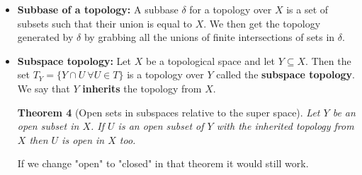 \documentclass[a4paper]{article}
\newtheorem{theorem}{Theorem}[section]
\begin{document}
\begin{itemize}
\begin{enumerate}
\item
A subset $U$ of $X$ is called open iff for every $x \in U$ there exists a $B_{0} \in B$ such that $x \in B_{0} \subset U$.
\item
The topology T is the collection of all unions of subsets in B.
\end{enumerate}
\begin{theorem}[Going from topology to base]
Let $X$ be a topological space, and $C$ a collection of open subsets from $X$. If we have that for every open subset $U$ of $X$ and $x \in U$ there exists an element $C_{0} \in C$ such that $x \in C_{0} \subset U$ then $C$ is a base for the topology $T$.
\end{theorem}

\begin{theorem}[Comparison of topologies from bases]
Let $B_{1},B_{2}$ be bases for the topologies $T_{1},T_{2}$ respectively. The following are equivalent:
\begin{enumerate}
\item
$T_{1} \subset T_{2}$
\item
For every $x$ and subsets $b_{1} \in B_{1}$ that have $x \in b_{1}$ there exists a $b_{2} \in B_{2}$ such that $x \in b_{2} \subset b_{1}$.
\end{enumerate}
\end{theorem}

\begin{theorem}[Closure and base]
Let $A\subseteq X$ and the topology on $X$ be given by a base. Then $x\in\bar{A}$ iff every basic neighborhood of $x$ intersects $A$.
\end{theorem}

\item
\textbf{Subbase of a topology: }A subbase $\delta$ for a topology over $X$ is a set of subsets such that their union is equal to $X$. We then get the topology generated by $\delta$ by grabbing all the unions of finite intersections of sets in $\delta$.

\item
\textbf{Subspace topology: }Let $X$ be a topological space and let $Y\subseteq X$. Then the set $T_{Y}=\{Y\cap U\ \forall U\in T \}$ is a topology over $Y$ called the \textbf{subspace topology}. We say that $Y$ \textbf{inherits} the topology from $X$.

\begin{theorem}[Open sets in subspaces relative to the super space]
Let $Y$ be an open subset in $X$. If $U$ is an open subset of $Y$ with the inherited topology from $X$ then $U$ is open in $X$ too.
\end{theorem}
If we change "open" to "closed" in that theorem it would still work.


\end{itemize}
\end{document}
